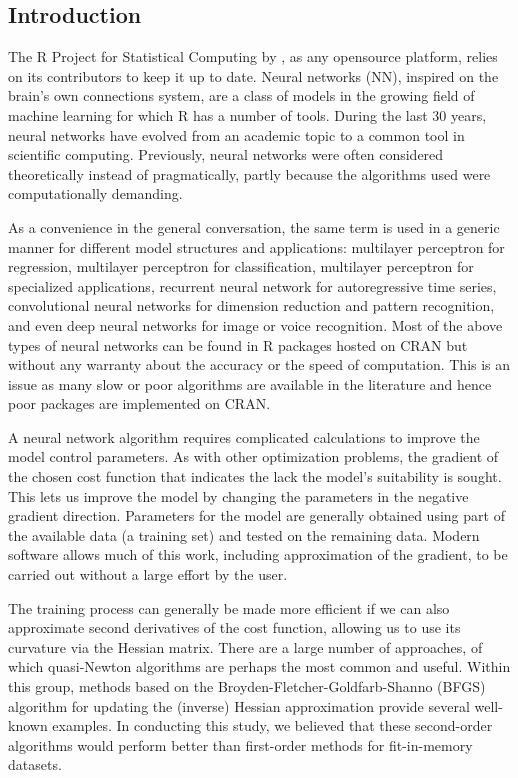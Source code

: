 \hypertarget{introduction}{%
\subsection{Introduction}\label{introduction}}

The \textsf{R} Project for Statistical Computing by \citep{Rsoft20}, as
any opensource platform, relies on its contributors to keep it up to
date. Neural networks (NN), inspired on the brain's own connections
system, are a class of models in the growing field of machine learning
for which \textsf{R} has a number of tools. During the last 30 years,
neural networks have evolved from an academic topic to a common tool in
scientific computing. Previously, neural networks were often considered
theoretically instead of pragmatically, partly because the algorithms
used were computationally demanding.

As a convenience in the general conversation, the same term is used in a
generic manner for different model structures and applications:
multilayer perceptron for regression, multilayer perceptron for
classification, multilayer perceptron for specialized applications,
recurrent neural network for autoregressive time series, convolutional
neural networks for dimension reduction and pattern recognition, and
even deep neural networks for image or voice recognition. Most of the
above types of neural networks can be found in R packages hosted on CRAN
but without any warranty about the accuracy or the speed of computation.
This is an issue as many slow or poor algorithms are available in the
literature and hence poor packages are implemented on CRAN.

A neural network algorithm requires complicated calculations to improve
the model control parameters. As with other optimization problems, the
gradient of the chosen cost function that indicates the lack the model's
suitability is sought. This lets us improve the model by changing the
parameters in the negative gradient direction. Parameters for the model
are generally obtained using part of the available data (a training set)
and tested on the remaining data. Modern software allows much of this
work, including approximation of the gradient, to be carried out without
a large effort by the user.

The training process can generally be made more efficient if we can also
approximate second derivatives of the cost function, allowing us to use
its curvature via the Hessian matrix. There are a large number of
approaches, of which quasi-Newton algorithms are perhaps the most common
and useful. Within this group, methods based on the
Broyden-Fletcher-Goldfarb-Shanno (BFGS) algorithm for updating the
(inverse) Hessian approximation provide several well-known examples. In
conducting this study, we believed that these second-order algorithms
would perform better than first-order methods for fit-in-memory
datasets.

